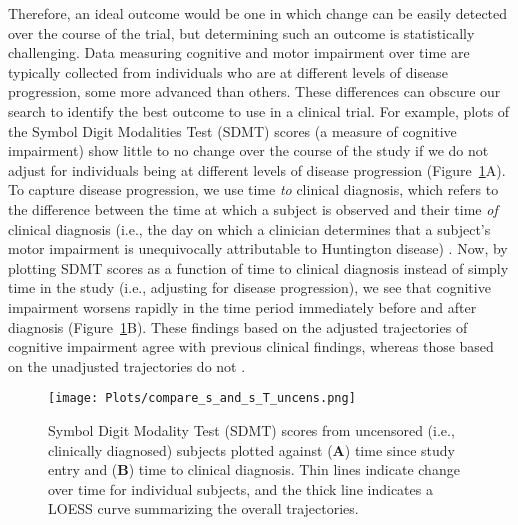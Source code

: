 \documentclass[12pt]{article}
\begin{document}
Therefore, an ideal outcome would be one %
in which change can be easily detected over the course of the trial, but %
determining such an outcome is statistically challenging. Data measuring cognitive and motor impairment over time are typically collected from individuals who are at different levels of disease progression, some more advanced than others. These differences can obscure our search to identify the best outcome to use in a clinical trial. For example, plots of the Symbol Digit Modalities Test (SDMT) scores (a measure of cognitive impairment) show little to no change over the course of the study if we do not adjust for individuals being at different levels of disease progression (Figure~\ref{fig:compare_s_and_s_T_uncens}A). To capture disease progression, we use time \textit{to} clinical diagnosis, which refers to the difference between the time at which a subject is observed and their time \textit{of} clinical diagnosis (i.e., the day on which a clinician determines that a subject's motor impairment is unequivocally attributable to Huntington disease) \citep{kieburtz1996controlled}. %
Now, %
by plotting SDMT scores as a function of time to clinical diagnosis instead of simply time in the study (i.e., adjusting for disease progression), we see that cognitive impairment worsens rapidly in the time period immediately before and after diagnosis (Figure~\ref{fig:compare_s_and_s_T_uncens}B). These findings based on the adjusted trajectories of cognitive impairment %
agree with previous clinical findings, whereas those based on the unadjusted trajectories %
do not \citep{paulsen2008detection}.

\begin{figure}[!t]
    \centering
    \texttt{[image: Plots/compare\_s\_and\_s\_T\_uncens.png]}
    \caption{Symbol Digit Modality Test (SDMT) scores from uncensored (i.e., clinically diagnosed) subjects plotted against (\textbf{A}) time since study entry and (\textbf{B}) time to clinical diagnosis. Thin lines indicate change over time for individual subjects, and the thick line indicates a LOESS curve summarizing the overall trajectories.}
    \label{fig:compare_s_and_s_T_uncens}
\end{figure}
\end{document}
